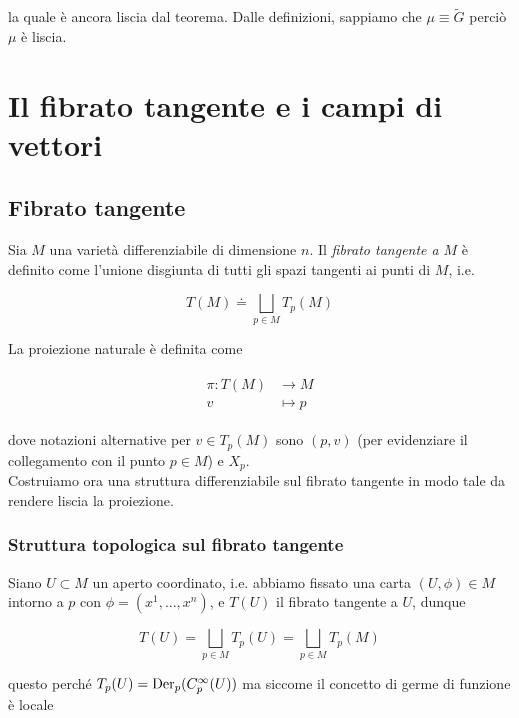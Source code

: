 la quale è ancora liscia dal teorema. Dalle definizioni, sappiamo che $ \mu \equiv \tilde{G} $ perciò $ \mu $ è liscia.

\section{Il fibrato tangente e i campi di vettori}

\subsection{Fibrato tangente}

Sia $ M $ una varietà differenziabile di dimensione $ n $. Il \textit{fibrato tangente a} $ M $ è definito come l'unione disgiunta di tutti gli spazi tangenti ai punti di $ M $, i.e.

\begin{equation}
	T(M) \doteq \bigsqcup_{p \in M} T_{p}(M)
\end{equation}

La proiezione naturale è definita come

\begin{align}
	\begin{split}
		\pi : T(M) &\to M\\
		v &\mapsto p
	\end{split}
\end{align}

dove notazioni alternative per $ v \in T_{p}(M) $ sono $ (p,v) $ (per evidenziare il collegamento con il punto $ p \in M $) e $ X_{p} $.\\
Costruiamo ora una struttura differenziabile sul fibrato tangente in modo tale da rendere liscia la proiezione.

\subsubsection{Struttura topologica sul fibrato tangente}

Siano $ U \subset M $ un aperto coordinato, i.e. abbiamo fissato una carta $ (U,\phi) \in M $ intorno a $ p $ con $ \phi = (x^{1},\dots,x^{n}) $, e $ T(U) $ il fibrato tangente a $ U $, dunque

\begin{equation}
	T(U) = \bigsqcup_{p \in M} T_{p}(U) = \bigsqcup_{p \in M} T_{p}(M)
\end{equation}

questo perché $ T_{p}(U) = \operatorname{Der}_{p}(C_{p}^{\infty}(U)) $ ma siccome il concetto di germe di funzione è locale

